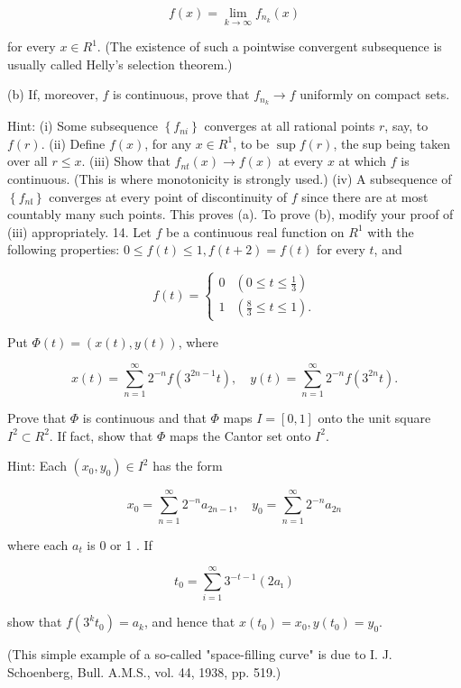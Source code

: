 \documentclass[10pt]{article}
\begin{document}
$$
f(x)=\lim _{k \rightarrow \infty} f_{n_{k}}(x)
$$

for every $x \in R^{1}$. (The existence of such a pointwise convergent subsequence is usually called Helly's selection theorem.)

(b) If, moreover, $f$ is continuous, prove that $f_{n_{k}} \rightarrow f$ uniformly on compact sets.

Hint: (i) Some subsequence $\left\{f_{n i}\right\}$ converges at all rational points $r$, say, to $f(r)$. (ii) Define $f(x)$, for any $x \in R^{1}$, to be $\sup f(r)$, the sup being taken over all $r \leq x$. (iii) Show that $f_{n t}(x) \rightarrow f(x)$ at every $x$ at which $f$ is continuous. (This is where monotonicity is strongly used.) (iv) A subsequence of $\left\{f_{n \mathfrak{l}}\right\}$ converges at every point of discontinuity of $f$ since there are at most countably many such points. This proves (a). To prove (b), modify your proof of (iii) appropriately. 14. Let $f$ be a continuous real function on $R^{1}$ with the following properties: $0 \leq f(t) \leq 1, f(t+2)=f(t)$ for every $t$, and

$$
f(t)= \begin{cases}0 & \left(0 \leq t \leq \frac{1}{3}\right) \\ 1 & \left(\frac{8}{3} \leq t \leq 1\right) .\end{cases}
$$

Put $\Phi(t)=(x(t), y(t))$, where

$$
x(t)=\sum_{n=1}^{\infty} 2^{-n} f\left(3^{2 n-1} t\right), \quad y(t)=\sum_{n=1}^{\infty} 2^{-n} f\left(3^{2 n} t\right) .
$$

Prove that $\Phi$ is continuous and that $\Phi$ maps $I=[0,1]$ onto the unit square $I^{2} \subset R^{2}$. If fact, show that $\Phi$ maps the Cantor set onto $I^{2}$.

Hint: Each $\left(x_{0}, y_{0}\right) \in I^{2}$ has the form

$$
x_{0}=\sum_{n=1}^{\infty} 2^{-n} a_{2 n-1}, \quad y_{0}=\sum_{n=1}^{\infty} 2^{-n} a_{2 n}
$$

where each $a_{t}$ is 0 or 1 . If

$$
t_{0}=\sum_{i=1}^{\infty} 3^{-t-1}\left(2 a_{\imath}\right)
$$

show that $f\left(3^{k} t_{0}\right)=a_{k}$, and hence that $x\left(t_{0}\right)=x_{0}, y\left(t_{0}\right)=y_{0}$.

(This simple example of a so-called "space-filling curve" is due to I. J. Schoenberg, Bull. A.M.S., vol. 44, 1938, pp. 519.)
\end{document}
